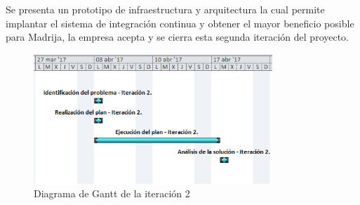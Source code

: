 Se presenta un prototipo de infraestructura y arquitectura la cual permite implantar el sistema de integración continua y obtener el mayor beneficio posible para \ac{Madrija}, la empresa acepta y se cierra esta segunda iteración del proyecto.





\begin{figure}[!h]
\centering
   \includegraphics[width=9cm]{Diag-Gantt_It2.PNG}
\caption{Diagrama de Gantt de la iteración 2}
\end{figure}

